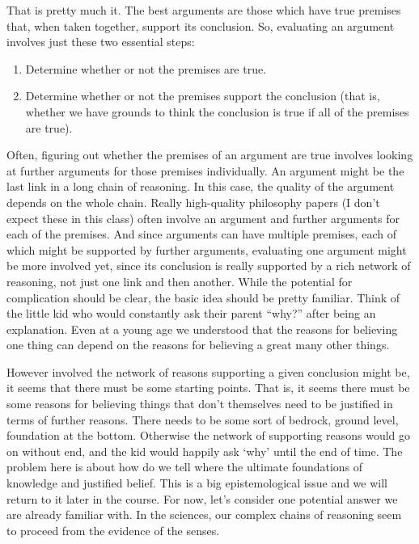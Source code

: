 That is pretty much it. The best arguments are those which have true premises that, when taken together, support its conclusion. So, evaluating an argument involves just these two essential steps:
\begin{enumerate}
    \item Determine whether or not the premises are true.
    \item Determine whether or not the premises support the conclusion (that is, whether we have grounds to think the conclusion is true if all of the premises are true).
\end{enumerate}
Often, figuring out whether the premises of an argument are true involves looking at further arguments for those premises individually. An argument might be the last link in a long chain of reasoning. In this case, the quality of the argument depends on the whole chain. Really high-quality philosophy papers (I don't expect these in this class) often involve an argument and further arguments for each of the premises. And since arguments can have multiple premises, each of which might be supported by further arguments, evaluating one argument might be more involved yet, since its conclusion is really supported by a rich network of reasoning, not just one link and then another. While the potential for complication should be clear, the basic idea should be pretty familiar. Think of the little kid who would constantly ask their parent “why?” after being an explanation. Even at a young age we understood that the reasons for believing one thing can depend on the reasons for believing a great many other things.

However involved the network of reasons supporting a given conclusion might be, it seems that there must be some starting points. That is, it seems there must be some reasons for believing things that don’t themselves need to be justified in terms of further reasons. There needs to be some sort of bedrock, ground level, foundation at the bottom. Otherwise the network of supporting reasons would go on without end, and the kid would happily ask `why' until the end of time. The problem here is about how do we tell where the ultimate foundations of knowledge and justified belief. This is a big epistemological issue and we will return to it later in the course. For now, let’s consider one potential answer we are already familiar with. In the sciences, our complex chains of reasoning seem to proceed from the evidence of the senses.

